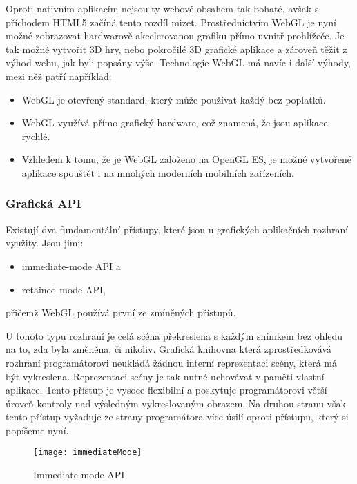 Oproti nativním aplikacím nejsou ty webové obsahem tak bohaté, avšak s příchodem HTML5 začíná tento rozdíl mizet. Prostřednictvím WebGL je nyní možné zobrazovat hardwarově akcelerovanou grafiku přímo uvnitř prohlížeče. Je tak možné vytvořit 3D hry, nebo pokročilé 3D grafické aplikace a zároveň těžit z výhod webu, jak byli popsány výše. Technologie WebGL má navíc i další výhody, mezi něž patří například:
\begin{itemize}
\item WebGL je otevřený standard, který může používat každý bez poplatků.
\item WebGL využívá přímo grafický hardware, což znamená, že jsou aplikace rychlé.
\item Vzhledem k tomu, že je WebGL založeno na OpenGL ES, je možné vytvořené aplikace spouštět i na mnohých moderních mobilních zařízeních.
\end{itemize}

\subsubsection*{Grafická API}
\label{subsection:grafickaAPI}
Existují dva fundamentální přístupy, které jsou u grafických aplikačních rozhraní využity. Jsou jimi:
\begin{itemize}
\item immediate-mode API a 
\item retained-mode API,
\end{itemize}
přičemž WebGL používá první ze zmíněných přístupů.


U tohoto typu rozhraní je celá scéna překreslena s každým snímkem bez ohledu na to, zda byla změněna, či nikoliv. Grafická knihovna která zprostředkovává rozhraní programátorovi neukládá žádnou interní reprezentaci scény, která má být vykreslena. Reprezentaci scény je tak nutné uchovávat v paměti vlastní aplikace. Tento přístup je vysoce flexibilní a poskytuje programátorovi větší úroveň kontroly nad výsledným vykreslovaným obrazem. Na druhou stranu však tento přístup vyžaduje ze strany programátora více úsilí oproti přístupu, který si popíšeme nyní.

\begin{figure}[htb]
\centering
\texttt{[image: immediateMode]}
\caption{Immediate-mode API}
\label{fig:immediateMode}
\end{figure}

